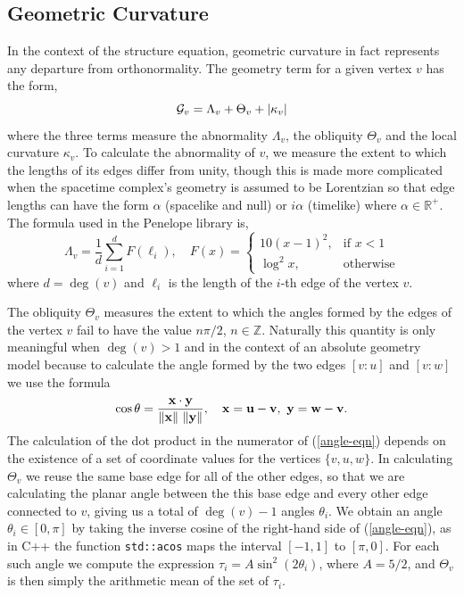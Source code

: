 \documentclass[12pt,letterpaper]{report}
\begin{document}
\subsection{Geometric Curvature}

In the context of the structure equation, geometric curvature in fact represents any departure from 
orthonormality. The geometry term for a given vertex $v$ has the form,
\begin{equation}
{\cal G}_v = \Lambda_v + \Theta_v + \left\lvert\kappa_v\right\rvert  
\end{equation}
where the three terms measure the abnormality $\Lambda_v$, the obliquity $\Theta_v$ 
and the local curvature $\kappa_v$. To calculate the abnormality of $v$, we measure the extent to which 
the lengths of its edges differ from unity, though this is made more complicated when the spacetime 
complex's geometry is assumed to be Lorentzian so that edge lengths can have the form $\alpha$ (spacelike 
and null) or $i\alpha$ (timelike) where $\alpha\in\mathbb{R}^+$. The formula used in the Penelope library 
is,
\begin{equation*}
\Lambda_v = \frac {1}{d}\sum_{i=1}^d F(\ell_i), \quad F(x) = \begin{cases} 
                                                         10(x -1)^2,& \text{if } x < 1 \\
                                                         \log^2x,& \text{otherwise}
                                                              \end{cases}  
\end{equation*} 
where $d=\deg(v)$ and $\ell_i$ is the length of the $i$-th edge of the vertex $v$.

The obliquity $\Theta_v$ measures the extent to which the angles formed by the edges of the vertex $v$ 
fail to have the value $n\pi/2$, $n\in\mathbb{Z}$. Naturally this quantity is only meaningful when $\deg(v) > 1$ 
and in the context of an absolute geometry model because to calculate the angle formed by the two edges $[v:u]$ 
and $[v:w]$ we use the formula
\begin{equation}
\cos\theta = \frac {\mathbf{x}\cdot \mathbf{y}}{\left\lVert\mathbf{x}\right\rVert\, \left\lVert\mathbf{y}\right\rVert}, \quad \mathbf{x} = \mathbf{u} - \mathbf{v}, \,\, 
\mathbf{y} = \mathbf{w} - \mathbf{v}. \label{angle-eqn} 
\end{equation}
The calculation of the dot product in the numerator of (\ref{angle-eqn}) depends on the existence of a set of 
coordinate values for the vertices $\{v,u,w\}$. In calculating $\Theta_v$ we reuse the same base edge for all of 
the other edges, so that we are calculating the planar angle between the this base edge and every other edge 
connected to $v$, giving us a total of $\deg(v)-1$ angles $\theta_i$. We obtain an angle $\theta_i \in [0,\pi]$ 
by taking the inverse cosine of the right-hand side of (\ref{angle-eqn}), as in C++ the function \texttt{std::acos} 
maps the interval $[-1,1]$ to $[\pi,0]$. For each such angle we compute the expression $\tau_i = A\sin^2(2\theta_i)$, 
where $A=5/2$, and $\Theta_v$ is then simply the arithmetic mean of the set of $\tau_i$.   
\end{document}
